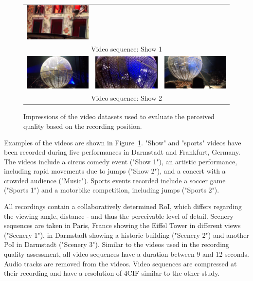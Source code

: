 \begin{figure}[!htb]
\begin{tabular}{ccc}
		\includegraphics[width=.3\textwidth]{./gfx/400_UGV_Quality/Video_Frames/jump3}
		\\ 
		\multicolumn{3}{c}{Video sequence: Show 1}
		\\
		\includegraphics[width=.31\textwidth]{./gfx/400_UGV_Quality/Video_Frames/motor_circle_1} &
		\includegraphics[width=.31\textwidth]{./gfx/400_UGV_Quality/Video_Frames/motor_circle_2} &
		\includegraphics[width=.31\textwidth]{./gfx/400_UGV_Quality/Video_Frames/motor_circle_3}
		\\ 
		\multicolumn{3}{c}{Video sequence: Show 2}
		
		
	\end{tabular}
	\caption[Sample frames for the recording position dataset.]{Impressions of the video datasets used to evaluate the perceived quality based on the recording position.}
	\label{fig:420_impression}
\end{figure}

Examples of the videos are shown in Figure~\ref{fig:420_impression}.
"Show" and "sports" videos have been recorded during live performances in Darmstadt and Frankfurt, Germany. 
The videos include a circus comedy event ("Show 1"), an artistic performance, including rapid movements due to jumps ("Show 2"), and a concert with a crowded audience ("Music"). 
Sports events recorded include a soccer game ("Sports 1") and a motorbike competition, including jumps ("Sports 2"). 

All recordings contain a collaboratively determined \ac{RoI}, which differs regarding the viewing angle, distance - and thus the perceivable level of detail. 
Scenery sequences are taken in Paris, France showing the Eiffel Tower in different views ("Scenery 1"), in Darmstadt showing a historic building ("Scenery 2") and another \ac{PoI} in Darmstadt ("Scenery 3").  
Similar to the videos used in the recording quality assessment, all video sequences have a duration between 9 and 12 seconds. 
Audio tracks are removed from the videos. 
Video sequences are compressed at their recording and have a resolution of \ac{4CIF} similar to the other study. 
